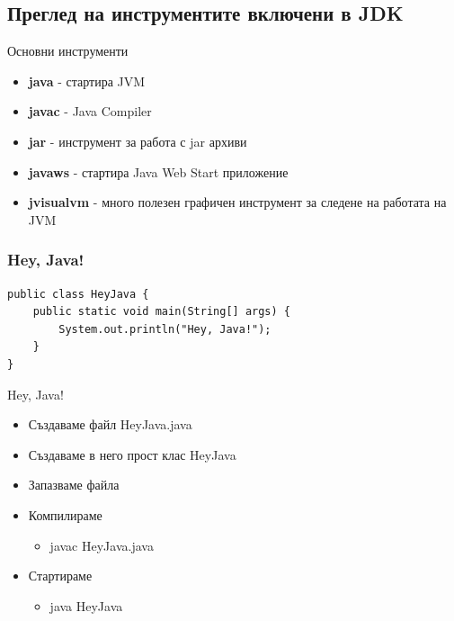 \documentclass{beamer}
\begin{document}
\subsection{Преглед на инструментите включени в JDK}
\begin{frame}{Основни инструменти}
  \transdissolve  
  \begin{itemize}
    \item \textbf{java} - стартира JVM
    \item \textbf{javac} - Java Compiler
    \item \textbf{jar} - инструмент за работа с jar архиви
    \item \textbf{javaws} - стартира Java Web Start
    приложение
    \item \textbf{jvisualvm} - много
    полезен графичен инструмент за следене на работата на JVM
  \end{itemize}
\end{frame}

\begin{frame}[fragile]
  \frametitle{Hey, Java!}
  \transdissolve
\begin{lstlisting}
public class HeyJava {
    public static void main(String[] args) {
        System.out.println("Hey, Java!");
    }
}
\end{lstlisting}
\end{frame}

\begin{frame}{Hey, Java!}
  \transdissolve  
  \begin{itemize}
    \item Създаваме файл HeyJava.java
    \item Създаваме в него прост клас HeyJava
    \item Запазваме файла
    \item Компилираме
      \begin{itemize}
        \item javac HeyJava.java
      \end{itemize}
    \item Стартираме
      \begin{itemize}
      \item java HeyJava
      \end{itemize}
  \end{itemize}
\end{frame}
\end{document}
